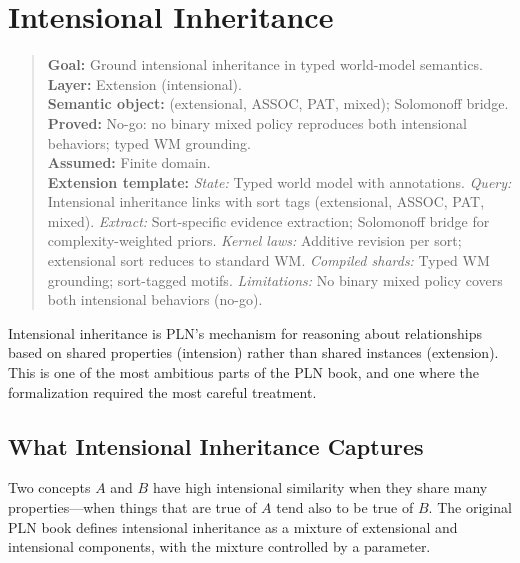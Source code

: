 \documentclass[11pt,openany]{report}
\begin{document}
\chapter{Intensional Inheritance}
\label{ch:intensional}

\begin{quote}\small
\textbf{Goal:} Ground intensional inheritance in typed world-model semantics.\\
\textbf{Layer:} Extension (intensional).\\
\textbf{Semantic object:}  (extensional, ASSOC, PAT, mixed); Solomonoff bridge.\\
\textbf{Proved:} No-go: no binary mixed policy reproduces both intensional behaviors; typed WM grounding.\\
\textbf{Assumed:} Finite domain.\\[4pt]
\textbf{Extension template:}
\textit{State:} Typed world model with  annotations.
\textit{Query:} Intensional inheritance links with sort tags (extensional, ASSOC, PAT, mixed).
\textit{Extract:} Sort-specific evidence extraction; Solomonoff bridge for complexity-weighted priors.
\textit{Kernel laws:} Additive revision per sort; extensional sort reduces to standard WM.
\textit{Compiled shards:} Typed WM grounding; sort-tagged motifs.
\textit{Limitations:} No binary mixed policy covers both intensional behaviors (no-go).
\end{quote}

Intensional inheritance is PLN's mechanism for reasoning about
relationships based on shared properties (intension) rather than shared
instances (extension).  This is one of the most ambitious parts of the
PLN book, and one where the formalization required the most careful
treatment.

\section{What Intensional Inheritance Captures}

Two concepts $A$ and $B$ have high intensional similarity when they share
many properties---when things that are true of $A$ tend also to be true
of $B$.  The original PLN book defines intensional inheritance as a
mixture of extensional and intensional components, with the mixture
controlled by a parameter.

\end{document}
